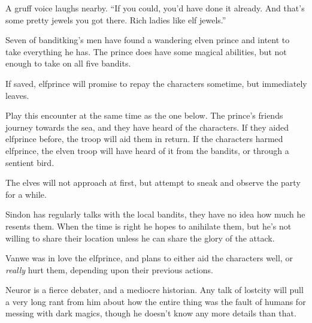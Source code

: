 \begin{multicols}{2}
\begin{boxtext}
	A gruff voice laughs nearby.  ``If you could, you'd have done it already.  And that's some pretty jewels you got there.  Rich ladies like elf jewels.''

\end{boxtext}

Seven of \gls{banditking}'s men have found a wandering elven prince and intent to take everything he has.  The prince does have some magical abilities, but not enough to take on all five bandits.


\humansoldier


\elf

If saved, \gls{elfprince} will promise to repay the characters sometime, but immediately leaves.


Play this encounter at the same time as the one below.  The prince's friends journey towards the sea, and they have heard of the characters.  If they aided \gls{elfprince} before, the troop will aid them in return.  If the characters harmed \gls{elfprince}, the elven troop will have heard of it from the bandits, or through a sentient bird.

The elves will not approach at first, but attempt to sneak and observe the party for a while.


\elf

Sindon has regularly talks with the local bandits, they have no idea how much he resents them.  When the time is right he hopes to anihilate them, but he's not willing to share their location unless he can share the glory of the attack.

\elf

Vanwe was in love the \gls{elfprince}, and plans to either aid the characters well, or \emph{really} hurt them, depending upon their previous actions.


\label{neuror}

Neuror is a fierce debater, and a mediocre historian.  Any talk of \gls{lostcity} will pull a very long rant from him about how the entire thing was the fault of humans for messing with dark magics, though he doesn't know any more details than that.

\elf

\end{multicols}

